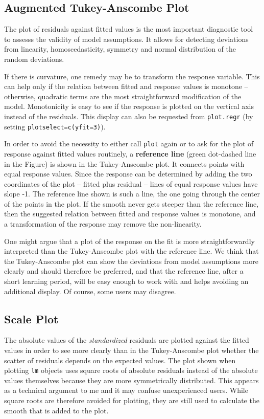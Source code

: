 \documentclass{article}
\providecommand{\T}{\texttt}
\providecommand{\ul}{\textbf}
\begin{document}
\subsection{Augmented Tukey-Anscombe Plot}
The plot of residuals against fitted values is the most important
diagnostic tool to assesss the validity of model assumptions.
It allows for detecting deviations from linearity, homoscedasticity,
symmetry and normal distribution of the random deviations.

If there is curvature, one remedy may be to transform the response
variable. This can help only if the relation between fitted and
response values is monotone -- otherwise, quadratic terms are the
most straightforward modification of the model.
Monotonicity is easy to see if the response is plotted on the vertical
axis instead of the residuals.
This display can also be requested from \T{plot.regr}
(by setting \T{plotselect=c(yfit=3)}).

In order to avoid the necessity to either call \T{plot} again or to 
ask for the plot of response against fitted values routinely,
a \ul{reference line} (green dot-dashed line in the Figure)
is shown in the Tukey-Anscombe plot.
It connects points with equal response values. Since the response can be
determined by adding the two coordinates of the plot -- 
fitted plus residual -- lines of equal response values have slope -1.
The reference line shown is such a line, the one going through the center
of the points in the plot.
If the smooth never gets steeper than the reference line, then the
suggested relation between fitted and response values is monotone, and a
transformation of the response may remove the non-linearity.

One might argue that a plot of the response on the fit is more
straightforwardly interpreted than the Tukey-Anscombe plot with the
reference line. We think that the Tukey-Anscombe plot can show the
deviations from model assumptions more clearly and should therefore be
preferred, and that the reference line, after a short learning period, will
be easy enough to work with and helps avoiding an additional display. 
Of course, some users may disagree.

\subsection{Scale Plot}
The absolute values of the \emph{standardized} residuals are plotted
against the fitted values 
in order to see more clearly than in the Tukey-Anscombe plot whether the 
scatter of residuals depends on the expected values.
The plot shown when plotting \T{lm} objects uses square roots of absolute
residuals instead of the absolute values themselves because they are more
symmetrically distributed. This appears as a technical argument to me and
it may confuse unexperienced users. While square roots are therefore
avoided for plotting, they are still used to calculate the smooth that is
added to the plot.
\end{document}
